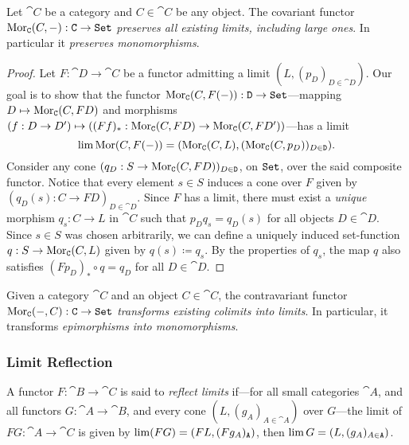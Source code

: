 \begin{proposition}
\label{prop:Mor-func-preserves-all-limits}
Let \(\cat C\) be a category and \(C \in \cat C\) be any object. The covariant
functor \(\operatorname{Mor}_{\texttt C}(C, -): \texttt C \to {\texttt{Set}}\) \emph{preserves all existing
  limits, including large ones}. In particular it \emph{preserves
  monomorphisms}.
\end{proposition}

\begin{proof}
Let \(F: \cat D \to \cat C\) be a functor admitting a limit
\((L, (p_D)_{D \in \cat D})\). Our goal is to show that the functor
\(\operatorname{Mor}_{\texttt C}(C, F(-)): \texttt D \to {\texttt{Set}}\)---mapping
\(D \mapsto \operatorname{Mor}_{\texttt C}(C, F D)\) and morphisms
\((f: D \to D') \mapsto ((F f)_{*}: \operatorname{Mor}_{\texttt C}(C, F D) \to \operatorname{Mor}_{\texttt C}(C, F
D'))\)---has a limit
\[
\operatorname{lim} \operatorname{Mor}(C, F(-))
= (\operatorname{Mor}_{\texttt C}(C, L), (\operatorname{Mor}_{\texttt C}(C, p_D))_{D \in \texttt D}).
\]
Consider any cone \((q_D: S \to \operatorname{Mor}_{\texttt C}(C, F D))_{D \in \texttt D}\), on
\({\texttt{Set}}\), over the said composite functor. Notice that every element \(s \in S\)
induces a cone over \(F\) given by \((q_D(s): C \to F D)_{D \in \cat D}\). Since
\(F\) has a limit, there must exist a \emph{unique} morphism \(q_s: C \to L\) in
\(\cat C\) such that \(p_D q_s = q_D(s)\) for all objects \(D \in \cat
D\). Since \(s \in S\) was chosen arbitrarily, we can define a uniquely induced
set-function \(q: S \to \operatorname{Mor}_{\texttt C}(C, L)\) given by \(q(s) \coloneq q_s\).
By the properties of \(q_s\), the map \(q\) also satisfies
\((F p_D)_{*} \circ q = q_D\) for all \(D \in \cat D\).
\end{proof}

\begin{corollary}
\label{cor:contrav-Mor-colim-into-lim}
Given a category \(\cat C\) and an object \(C \in \cat C\), the contravariant
functor \(\operatorname{Mor}_{\texttt C}(-, C): \texttt C \to {\texttt{Set}}\) \emph{transforms existing
  colimits into limits}. In particular, it transforms \emph{epimorphisms into
  monomorphisms}.
\end{corollary}

\subsubsection{Limit Reflection}

\begin{definition}
\label{def:functor-reflect-limit}
A functor \(F: \cat B \to \cat C\) is said to \emph{reflect limits} if---for all
small categories \(\cat A\), and all functors \(G: \cat A \to \cat B\), and
every cone \((L, (g_A)_{A \in \cat A})\) over \(G\)---the limit of \(F G: \cat
A \to \cat C\) is given by \(\operatorname{lim}(F G) = (F L, (F g_A)_{\texttt A})\), then \(\operatorname{lim}
G = (L, (g_A)_{A \in \texttt A})\).
\end{definition}

